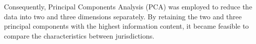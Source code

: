 \documentclass[man]{apa7}
\begin{document}
Consequently, Principal Components Analysis (PCA) was employed to reduce the data into two and three dimensions separately. By retaining the two and three principal components with the highest information content, it became feasible to compare the characteristics between jurisdictions.




\end{document}
